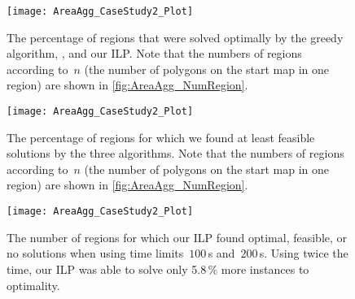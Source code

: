 \documentclass[acmsmall,natbib=false]{acmart}
\begin{document}
\begin{figure}[tb]
\centering
\texttt{[image: AreaAgg\_CaseStudy2\_Plot]}
\caption{The percentage of regions that were solved 
	optimally by the greedy algorithm, \Astar, and our ILP.
	Note that the numbers of regions according to~$n$ 
	(the number of polygons on the start map in one region) 
	are shown in \fig\ref{fig:AreaAgg_NumRegion}.}
\label{fig:AreaAgg_CaseStudy2_Percentage_Optimal}
%
\par\vspace{\baselineskip} %
%
\centering
\texttt{[image: AreaAgg\_CaseStudy2\_Plot]}
\caption{The percentage of regions for which we found at 
	least feasible solutions by the three algorithms.
	Note that the numbers of regions according to~$n$ 
	(the number of polygons on the start map in one region) 
	are shown in \fig\ref{fig:AreaAgg_NumRegion}.}
\label{fig:AreaAgg_CaseStudy2_Percentage_Feasible}
\end{figure}

\begin{figure}[tb]
\centering
\texttt{[image: AreaAgg\_CaseStudy2\_Plot]}
\caption{The number of regions for which
	our ILP found optimal, feasible, or no solutions 
	when using time limits~$100\,$s and~$200\,$s.
	Using twice the time, our ILP was able to 
	solve only 5.8$\,$\% more instances to optimality.}
\label{fig:AreaAgg_CaseStudy2_ILP}
\end{figure}
\end{document}
